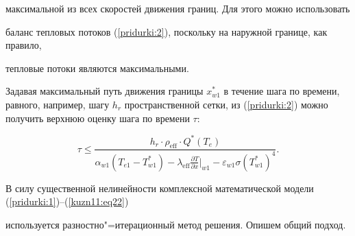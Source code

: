 максимальной из всех скоростей движения границ. Для этого можно использовать

баланс тепловых потоков (\ref{pridurki:2}), поскольку на наружной границе, как правило,

тепловые потоки являются максимальными.



Задавая максимальный путь движения границы $x_{w1}^\ast$ в течение шага по времени, равного, например, шагу $h_r$ пространственной сетки, из (\ref{pridurki:2}) можно получить верхнюю оценку шага по времени $\tau $:

\begin{equation*}


\tau \le \frac{h_r \cdot \rho _\text{eff} \cdot Q^\ast (T_e)}{\alpha_{w1} (T_{e1} -T_{w1}^\ast)-\lambda_\text{eff}

\frac{\partial T}{\partial x} \bigl|_{w1} - \varepsilon_{w1}

\sigma (T_{w1}^\ast)^4}.

\end{equation*}



В силу существенной нелинейности комплексной математической модели (\ref{pridurki:1})--(\ref{kuzn11:eq22})

используется разностно"=итерационный метод решения. Опишем общий подход.



